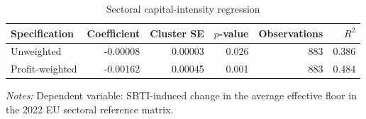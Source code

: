 \begin{table}[H]
\centering
\small
\caption[Sectoral capital-intensity regression]{Sectoral capital-intensity regression}
\label{tab:stage2_h5_regression}
\begin{tabular}{@{}lrrrrr@{}}
\toprule
Specification & Coefficient & Cluster SE & $p$-value & Observations & $R^2$ \\
\midrule
Unweighted & -0.00008 & 0.00003 & 0.026 & 883 & 0.386 \\
Profit-weighted & -0.00162 & 0.00045 & 0.001 & 883 & 0.484 \\
\bottomrule
\end{tabular}

\vspace{0.5em}
\begin{minipage}{0.96\textwidth}
\footnotesize\raggedright \textit{Notes:} Dependent variable: SBTI-induced change in the average effective floor in the 2022 EU sectoral reference matrix.
\end{minipage}
\end{table}
